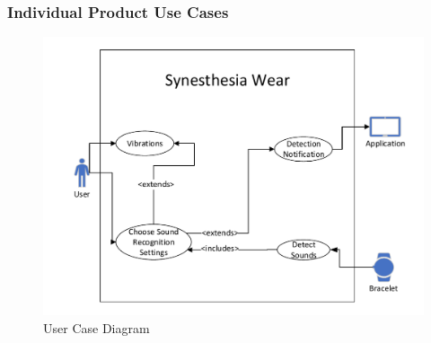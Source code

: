 \documentclass[12pt]{article}
\begin{document}
\subsubsection{Individual Product Use Cases}
\begin{figure}[H]
  \begin{center}
    \includegraphics{UCD.pdf}
    \caption{User Case Diagram}
  \label{ContextDiagram} 
  \end{center}
\end{figure}
\end{document}
